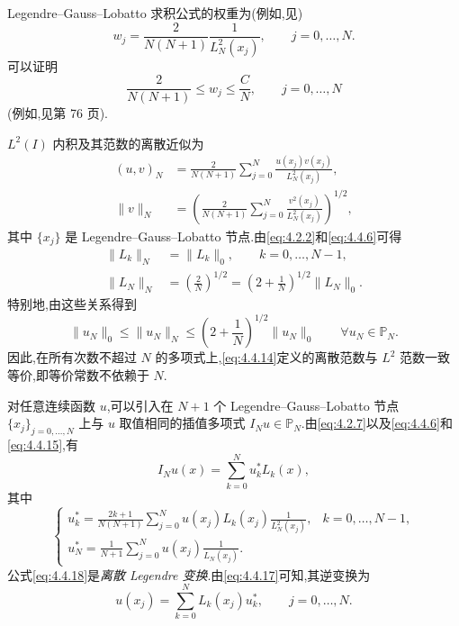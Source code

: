 Legendre--Gauss--Lobatto 求积公式的权重为(例如,见)
\begin{equation}\label{eq:4.4.13}
  w_j=\frac{2}{N(N+1)}\frac1{L_N^2(x_j)},\qquad j=0,\ldots,N.
\end{equation}
可以证明
\[
  \frac2{N(N+1)}\le w_j\le\frac CN,\qquad j=0,\ldots,N
\]
(例如,见第 76 页).

\(L^2(I)\) 内积及其范数的离散近似为
\begin{equation}\label{eq:4.4.14}
  \begin{aligned}
    (u,v)_N&=\frac{2}{N(N+1)}\sum_{j=0}^N\frac{u(x_j)v(x_j)}{L_N^2(x_j)},\\
    \|v\|_N&=\left(\frac{2}{N(N+1)}\sum_{j=0}^N\frac{v^2(x_j)}{L_N^2(x_j)}\right)^{1/2},
  \end{aligned}
\end{equation}
其中 \(\{x_j\}\) 是 Legendre--Gauss--Lobatto 节点.由\eqref{eq:4.2.2}和\eqref{eq:4.4.6}可得
\begin{equation}\label{eq:4.4.15}
  \begin{aligned}
    \|L_k\|_N&=\|L_k\|_0,\qquad k=0,\ldots,N-1,\\
    \|L_N\|_N&=\left(\frac2N\right)^{1/2}
      =\left(2+\frac1N\right)^{1/2}\|L_N\|_0.
  \end{aligned}
\end{equation}
特别地,由这些关系得到
\begin{equation}\label{eq:4.4.16}
  \|u_N\|_0\le\|u_N\|_N\le
    \left(2+\frac1N\right)^{1/2}\|u_N\|_0\qquad\forall u_N\in\mathbb P_N.
\end{equation}
因此,在所有次数不超过 \(N\) 的多项式上,\eqref{eq:4.4.14}定义的离散范数与 \(L^2\) 范数一致等价,即等价常数不依赖于 \(N\).

对任意连续函数 \(u\),可以引入在 \(N+1\) 个 Legendre--Gauss--Lobatto 节点 \(\{x_j\}_{j=0,\ldots,N}\) 上与 \(u\) 取值相同的插值多项式 \(I_Nu\in\mathbb P_N\).由\eqref{eq:4.2.7}以及\eqref{eq:4.4.6}和\eqref{eq:4.4.15},有
\begin{equation}\label{eq:4.4.17}
  I_Nu(x)=\sum_{k=0}^N u_k^*L_k(x),
\end{equation}
其中
\begin{equation}\label{eq:4.4.18}
  \begin{cases}
    \displaystyle
    u_k^*=\frac{2k+1}{N(N+1)}
      \sum_{j=0}^N u(x_j)L_k(x_j)\frac1{L_N^2(x_j)},&k=0,\ldots,N-1,\\[4pt]
    \displaystyle
    u_N^*=\frac1{N+1}\sum_{j=0}^Nu(x_j)\frac1{L_N(x_j)}.&
  \end{cases}
\end{equation}
公式\eqref{eq:4.4.18}是\emph{离散 Legendre 变换}.由\eqref{eq:4.4.17}可知,其逆变换为
\begin{equation}\label{eq:4.4.19}
  u(x_j)=\sum_{k=0}^N L_k(x_j)u_k^*,\qquad j=0,\ldots,N.
\end{equation}

